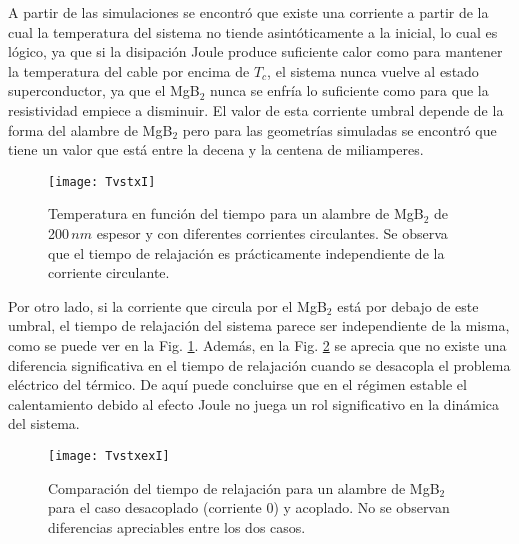 A partir de las simulaciones se encontró que existe una corriente a partir de la cual la temperatura del sistema no tiende asintóticamente a la inicial, lo cual es lógico, ya que si la disipación Joule produce suficiente calor como para mantener la temperatura del cable por encima de $T_c$, el sistema nunca vuelve al estado superconductor, ya que el MgB$_2$ nunca se enfría lo suficiente como para que la resistividad empiece a disminuir. El valor de esta corriente umbral depende de la forma del alambre de MgB$_2$ pero para las geometrías simuladas se encontró que tiene un valor que está entre la decena y la centena de miliamperes. 
\begin{figure}[h!]
 \begin{center}
    \texttt{[image: TvstxI]}
  \end{center}
  \caption[Temperatura en función del tiempo para un alambre de MgB$_2$ de 200\,$nm$ espesor y con diferentes corrientes circulantes.]{Temperatura en función del tiempo para un alambre de MgB$_2$ de 200\,$nm$ espesor y con diferentes corrientes circulantes. Se observa que el tiempo de relajación es prácticamente independiente de la corriente circulante.}
\label{fig:TvstxI}
\end{figure}

Por otro lado, si la corriente que circula por el MgB$_2$ está por debajo de este umbral, el tiempo de relajación del sistema parece ser independiente de la misma, como se puede ver en la Fig. \ref{fig:TvstxI}. Además, en la Fig. \ref{fig:TvstxexI} se aprecia que no existe una diferencia significativa en el tiempo de relajación cuando se desacopla el problema eléctrico del térmico. De aquí puede concluirse que en el régimen estable el calentamiento debido al efecto Joule no juega un rol significativo en la dinámica del sistema.

\begin{figure}[h!]
 \begin{center}
    \texttt{[image: TvstxexI]}
  \end{center}
  \caption[Comparación del tiempo de relajación para un alambre de MgB$_2$ para el caso desacoplado y acoplado.]{Comparación del tiempo de relajación para un alambre de MgB$_2$ para el caso desacoplado (corriente 0) y acoplado. No se observan diferencias apreciables entre los dos casos.}
\label{fig:TvstxexI}
\end{figure}

